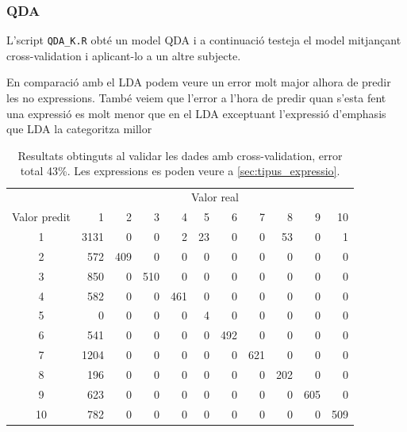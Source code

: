 \documentclass[a4paper]{article}
\begin{document}
\subsubsection{QDA}
L’script \verb|QDA_K.R|  obté un model QDA i a continuació testeja el model mitjançant cross-validation i aplicant-lo a un altre subjecte.


En comparació amb el LDA podem veure un error molt major alhora de predir les no expressions. També veiem que l’error a l’hora de predir quan s’esta fent una expressió es molt menor que en el LDA exceptuant l’expressió d’emphasis que LDA la categoritza millor

\begin{table}[H]
	\centering
	\def\arraystretch{1.2}
	\begin{tabular}{|c|rrrrrrrrrr|}
		\hline
		& \multicolumn{10}{c|}{Valor real} \\
		Valor predit & 1 & 2 & 3 & 4 & 5 & 6 & 7 & 8 & 9 & 10 \\
		\hline
		1 & 3131 & 0 & 0 & 2 & 23 & 0 & 0 & 53 & 0 & 1 \\
		2 & 572 & 409 & 0 & 0 & 0 & 0 & 0 & 0 & 0 & 0 \\
		3 & 850 & 0 & 510 & 0 & 0 & 0 & 0 & 0 & 0 & 0 \\
		4 & 582 & 0 & 0 & 461 & 0 & 0 & 0 & 0 & 0 & 0 \\
		5 & 0 & 0 & 0 & 0 & 4 & 0 & 0 & 0 & 0 & 0 \\
		6 & 541 & 0 & 0 & 0 & 0 & 492 & 0 & 0 & 0 & 0 \\
		7 & 1204 & 0 & 0 & 0 & 0 & 0 & 621 & 0 & 0 & 0 \\
		8 & 196 & 0 & 0 & 0 & 0 & 0 & 0 & 202 & 0 & 0 \\
		9 & 623 & 0 & 0 & 0 & 0 & 0 & 0 & 0 & 605 & 0 \\
		10 & 782 & 0 & 0 & 0 & 0 & 0 & 0 & 0 & 0 & 509 \\
		\hline
	\end{tabular}
	\captionsetup{width=0.8\textwidth}
	\caption{Resultats obtinguts al validar les dades amb cross-validation, error total 43\%. Les expressions es poden veure a \autoref{sec:tipus_expressio}.}
\end{table}
\end{document}
